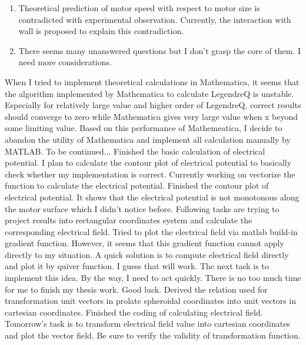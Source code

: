 \documentclass[fontsize=11pt, %
                             paper=a4, %
                             twoside, %
                             captions=tableheading,
                             index=totoc,
                             hyperref]{labbook}
\begin{document}
\begin{addmargin}[4cm]{0cm}
\begin{itemize}
\begin{enumerate}
\item
Theoretical prediction of motor speed with respect to motor size is contradicted with experimental observation. Currently, the interaction with wall is proposed to explain this contradiction.
\item There seems many unanswered questions but I don't grasp the core of them. I need more considerations. 
\end{enumerate}
\end{itemize}
When I tried to implement theoretical calculations in Mathematica, it seems that the algorithm implemented by Mathematica to calculate LegendreQ is unstable. Especially for relatively large value and higher order of LegendreQ, correct results should converge to zero while Mathematica gives very large value when x beyond some limiting value. Based on this performance of Mathemeatica, I decide to abandon the utility of Mathematica and implement all calculation manually by MATLAB. To be continued...
Finished the basic calculation of electrical potential. I plan to calculate the contour plot of electrical potential to basically check whether my implementation is correct. Currently working on vectorize the function to calculate the electrical potential.
Finished the contour plot of electrical potential. It shows that the electrical potential is not monotonous along the motor surface which I didn't notice before. Following tasks are trying to project results into rectangular coordinates system and calculate the corresponding electrical field.
Tried to plot the electrical field via matlab build-in gradient function. However, it seems that this gradient function cannot apply directly to my situation. A quick solution is to compute electrical field directly and plot it by quiver function. I guess that will work. The next task is to implement this idea. By the way, I need to act quickly. There is no too much time for me to finish my thesis work. Good luck.
Derived the relation used for transformation unit vectors in prolate spheroidal coordinates into unit vectors in cartesian coordinates. Finished the coding of calculating electrical field. Tomorrow's task is to transform electrical field value into cartesian coordinates and plot the vector field. Be sure to verify the validity of transformation function.





\end{addmargin}
\end{document}
